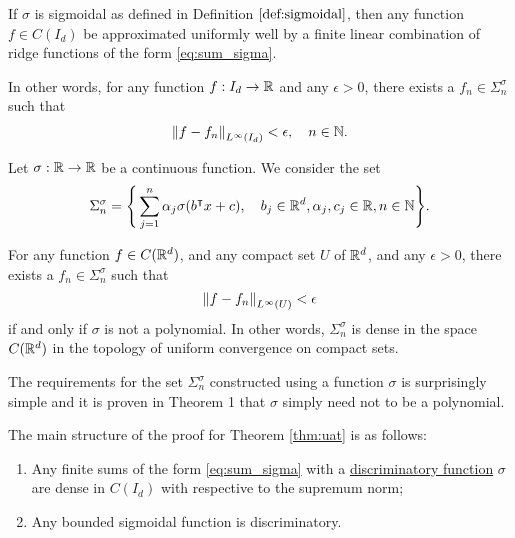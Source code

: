 \begin{theorem}
    \label{thm:uat}
    If $\sigma$ is sigmoidal as defined in Definition $\ref{def:sigmoidal}$,
    then any function $f \in C(I_d)$ be approximated uniformly well by a finite
    linear combination of ridge functions of the form \eqref{eq:sum_sigma}.

    In other words, for any function $f: I_d \to \mathbb{R}$ and any $\epsilon > 0$,
    there exists a $f_n \in \Sigma_n^{\sigma}$ such that
    \begin{align}
        \left\| f - f_n \right\|_{L^{\infty}(I_d)} < \epsilon, \quad n \in \mathbb{N}.
    \end{align}
\end{theorem}

\begin{theorem}
    Let $\sigma: \mathbb{R} \to \mathbb{R}$ be a continuous function. We consider the set
    \begin{equation}
        \Sigma_n^{\sigma} = \Bigg\{
            \sum_{j=1}^n \alpha_j \sigma(b{}^{\intercal} x + c), \quad
            b_j \in \mathbb{R}^d, \alpha_j, c_j \in \mathbb{R}, n\in\mathbb{N}
        \Bigg\}.
    \end{equation}

    For any function $f \in C(\mathbb{R}^d)$, and any compact set $U$ of $\mathbb{R}^d$, and any
    $\epsilon > 0$, there exists a $f_n \in \Sigma_n^{\sigma}$ such that 
    \begin{equation}
        \left\| f - f_n \right\|_{L^{\infty}(U)} < \epsilon
    \end{equation}
    if and only if $\sigma$ is not a polynomial. In other words,
    $\Sigma_n^{\sigma}$ is dense in the space $C(\mathbb{R}^d)$ in the topology of
    uniform convergence on compact sets.
\end{theorem}

\begin{remark}
    The requirements for the set $\Sigma_n^{\sigma}$ constructed using a
    function $\sigma$ is surprisingly simple and it is proven in Theorem 1
    \cite[p. 10]{leshnoMultilayerFeedforwardNetworks1993} that $\sigma$ simply
    need not to be a polynomial.
\end{remark}

The main structure of the proof for Theorem \ref{thm:uat} is as follows:
\begin{enumerate}
    \item Any finite sums of the form \eqref{eq:sum_sigma} with a
    \hyperref[def:dis_func]{discriminatory function} $\sigma$ are dense in
    $C(I_d)$ with respective to the supremum norm;
    \item Any bounded sigmoidal function is discriminatory.
\end{enumerate}

